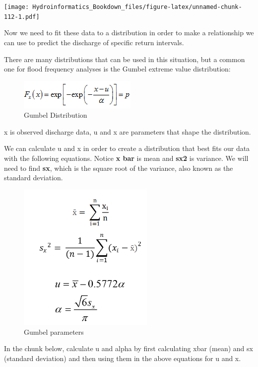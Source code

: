 \documentclass[
]{book}
\begin{document}
\texttt{[image: Hydroinformatics\_Bookdown\_files/figure-latex/unnamed-chunk-112-1.pdf]}

Now we need to fit these data to a distribution in order to make a relationship we can use to predict the discharge of specific return intervals.

There are many distributions that can be used in this situation, but a common one for flood frequency analyses is the Gumbel extreme value distribution:

\begin{figure}
\centering
\includegraphics{images/gumbel.png}
\caption{Gumbel Distribution}
\end{figure}

x is observed discharge data, u and x are parameters that shape the distribution.

We can calculate u and x in order to create a distribution that best fits our data with the following equations. Notice \textbf{x bar} is mean and \textbf{sx2} is variance. We will need to find \textbf{sx}, which is the square root of the variance, also known as the standard deviation.

\begin{figure}
\centering
\includegraphics[width=2.58333in,height=\textheight]{images/gumbelparams.png}
\caption{Gumbel parameters}
\end{figure}

In the chunk below, calculate u and alpha by first calculating xbar (mean) and sx (standard deviation) and then using them in the above equations for u and x.
\end{document}
